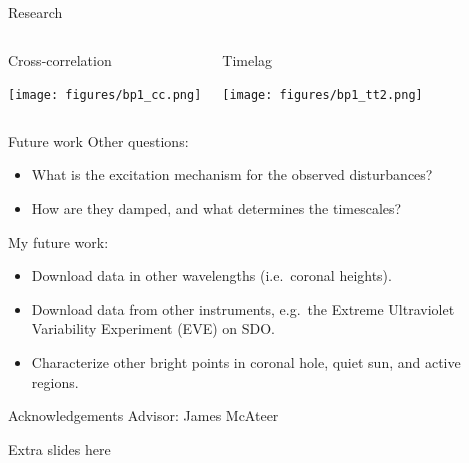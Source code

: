 \documentclass[11pt,table]{beamer}
\begin{document}
\begin{frame}{Research}
    \begin{columns}
        \begin{block}{\centering Cross-correlation}
            \begin{center}
                \texttt{[image: figures/bp1\_cc.png]}
            \end{center}
        \end{block}
        \begin{block}{\centering Timelag}
            \begin{center}
                \texttt{[image: figures/bp1\_tt2.png]}
            \end{center}
        \end{block}
    \end{columns}
\end{frame}%
\begin{frame}{Future work}
    Other questions:
    \begin{itemize}
        \item What is the excitation mechanism for the observed
            disturbances?
        \item How are they damped, and what determines the timescales?
    \end{itemize}
    My future work:
    \begin{itemize}
        \item Download data in other wavelengths (i.e.\ coronal heights).
        \item Download data from other instruments,
            e.g.\ the Extreme Ultraviolet Variability Experiment
            (EVE) on SDO\@.
        \item Characterize other bright points in coronal hole,
            quiet sun, and active regions.
    \end{itemize}
\end{frame}%
\begin{frame}{Acknowledgements}
    Advisor: James McAteer
\end{frame}%

\begin{frame}{Extra slides here}
\end{frame}
\end{document}
